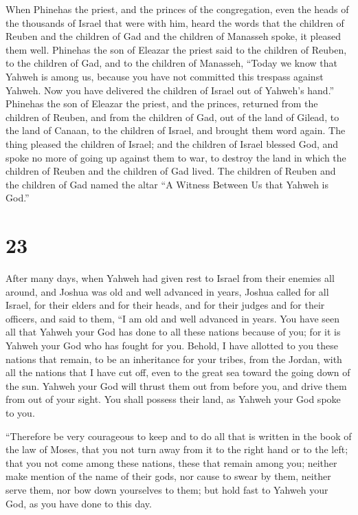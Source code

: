  When Phinehas the priest, and the princes of the
congregation, even the heads of the thousands of Israel that were with
him, heard the words that the children of Reuben and the children of Gad
and the children of Manasseh spoke, it pleased them well.
 Phinehas the son of Eleazar the priest said to the
children of Reuben, to the children of Gad, and to the children of
Manasseh, ``Today we know that Yahweh is among us, because you have not
committed this trespass against Yahweh. Now you have delivered the
children of Israel out of Yahweh's hand.''  Phinehas the
son of Eleazar the priest, and the princes, returned from the children
of Reuben, and from the children of Gad, out of the land of Gilead, to
the land of Canaan, to the children of Israel, and brought them word
again.  The thing pleased the children of Israel; and the
children of Israel blessed God, and spoke no more of going up against
them to war, to destroy the land in which the children of Reuben and the
children of Gad lived.  The children of Reuben and the
children of Gad named the altar ``A Witness Between Us that Yahweh is
God.''

\hypertarget{section-22}{%
\section{23}\label{section-22}}

 After many days, when Yahweh had given rest to Israel
from their enemies all around, and Joshua was old and well advanced in
years,  Joshua called for all Israel, for their elders and
for their heads, and for their judges and for their officers, and said
to them, ``I am old and well advanced in years.  You have
seen all that Yahweh your God has done to all these nations because of
you; for it is Yahweh your God who has fought for you. 
Behold, I have allotted to you these nations that remain, to be an
inheritance for your tribes, from the Jordan, with all the nations that
I have cut off, even to the great sea toward the going down of the sun.
 Yahweh your God will thrust them out from before you, and
drive them from out of your sight. You shall possess their land, as
Yahweh your God spoke to you.

 ``Therefore be very courageous to keep and to do all that
is written in the book of the law of Moses, that you not turn away from
it to the right hand or to the left;  that you not come
among these nations, these that remain among you; neither make mention
of the name of their gods, nor cause to swear by them, neither serve
them, nor bow down yourselves to them;  but hold fast to
Yahweh your God, as you have done to this day.

